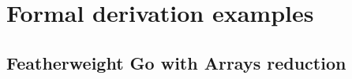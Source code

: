 \section{Formal derivation examples}

\subsection{Featherweight Go with Arrays reduction}
\label{sec:fg-derivation-example}



